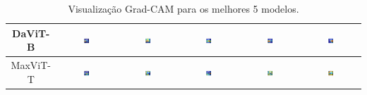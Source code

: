 \begin{table}
\begin{tabular}{|c|c|c|c|c|c|}
        DaViT-B & \includegraphics[width=0.15\textwidth]{figs/gradcams/gradcam_davit_kl0.png} & \includegraphics[width=0.15\textwidth]{figs/gradcams/gradcam_davit_kl1.png} & \includegraphics[width=0.15\textwidth]{figs/gradcams/gradcam_davit_kl2.png} & \includegraphics[width=0.15\textwidth]{figs/gradcams/gradcam_davit_kl3.png} & \includegraphics[width=0.15\textwidth]{figs/gradcams/gradcam_davit_kl4.png} \\ \hline
        MaxViT-T & \includegraphics[width=0.15\textwidth]{figs/gradcams/gradcam_maxvit_kl0.png} & \includegraphics[width=0.15\textwidth]{figs/gradcams/gradcam_maxvit_kl1.png} & \includegraphics[width=0.15\textwidth]{figs/gradcams/gradcam_maxvit_kl2.png} & \includegraphics[width=0.15\textwidth]{figs/gradcams/gradcam_maxvit_kl3.png} & \includegraphics[width=0.15\textwidth]{figs/gradcams/gradcam_maxvit_kl4.png} \\ \hline
    \end{tabular}
    \caption{Visualização Grad-CAM para os melhores 5 modelos.}
    \label{tab:gradcams_top5_models}
\end{table}


